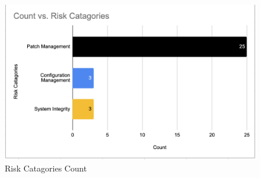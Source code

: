 \begin{figure}[h!]
\centering
\includegraphics[width=\textwidth]{pics/risk_cat.png}
\caption{Risk Catagories Count}\label{fig:bar_risks}
\end{figure}

